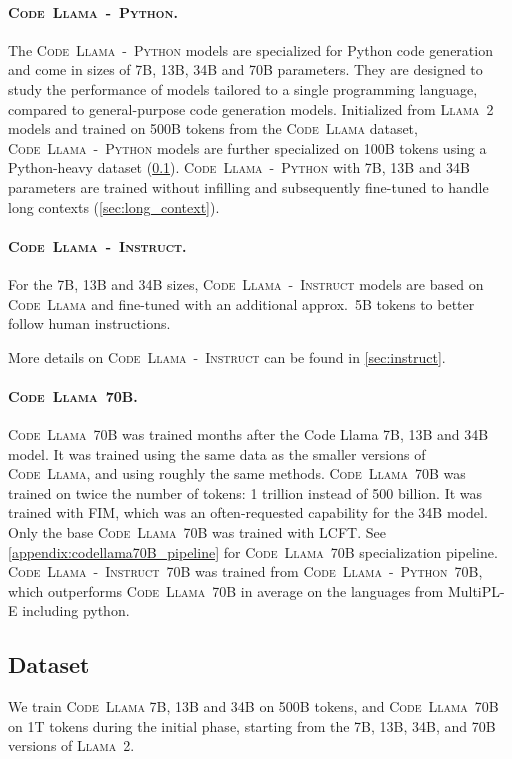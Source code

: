 \paragraph{\textsc{Code~Llama~-~Python}.} The \textsc{Code~Llama~-~Python} models are specialized for Python code generation and come in sizes of 7B, 13B, 34B and 70B parameters. They are designed to study the performance of models tailored to a single programming language, compared to general-purpose code generation models. Initialized from \textsc{Llama~2} models and trained on 500B tokens from the \textsc{Code~Llama} dataset, \textsc{Code~Llama~-~Python} models are further specialized on 100B tokens using a Python-heavy dataset (\ref{sec:dataset}).
\textsc{Code~Llama~-~Python} with 7B, 13B and 34B parameters are trained without infilling and subsequently fine-tuned to handle long contexts (\ref{sec:long_context}).

\paragraph{\textsc{Code~Llama~-~Instruct}.} For the 7B, 13B and 34B sizes, \textsc{Code~Llama~-~Instruct} models are based on \textsc{Code~Llama} and fine-tuned with an additional approx.~5B tokens to better follow human instructions.

More details on \textsc{Code~Llama~-~Instruct} can be found in \ref{sec:instruct}. 

\paragraph{\textsc{Code~Llama}~70B.} \textsc{Code~Llama}~70B was trained months after the Code Llama 7B, 13B and 34B model. It was trained using the same data as the smaller versions of \textsc{Code~Llama}, and using roughly the same methods. \textsc{Code~Llama}~70B was trained on twice the number of tokens: 1 trillion instead of 500 billion. It was trained with FIM, which was an often-requested capability for the 34B model. Only the base \textsc{Code~Llama}~70B was trained with LCFT. See \ref{appendix:codellama70B_pipeline} for \textsc{Code~Llama}~70B specialization pipeline.
\textsc{Code~Llama~-~Instruct}~70B was trained from \textsc{Code~Llama~-~Python}~70B, which outperforms \textsc{Code~Llama}~70B in average on the languages from MultiPL-E including python.

\subsection{Dataset}
\label{sec:dataset}
We train \textsc{Code~Llama} 7B, 13B and 34B on 500B tokens, and \textsc{Code~Llama}~70B on 1T tokens during the initial phase, starting from the 7B, 13B, 34B, and 70B versions of \textsc{Llama~2}. 

